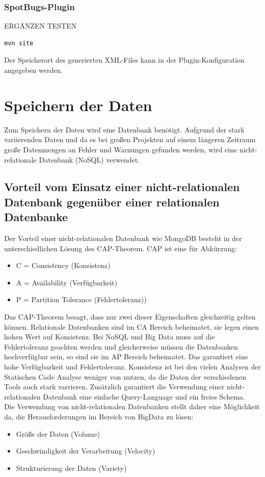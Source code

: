 \subsubsection{SpotBugs-Plugin}
ERGÄNZEN TESTEN
\begin{verbatim}
mvn site
\end{verbatim}
Der Speicherort des generierten XML-Files kann in der Plugin-Konfiguration angegeben werden.


\section{Speichern der Daten} 

Zum Speichern der Daten wird eine Datenbank benötigt. Aufgrund der stark variierenden Daten und da es bei großen Projekten auf einem längeren Zeitraum große Datenmengen an Fehler und Warnungen gefunden werden, wird eine nicht-relationale Datenbank (NoSQL) verwendet. 

\subsection{Vorteil vom Einsatz einer nicht-relationalen Datenbank gegenüber einer relationalen Datenbanke }
Der Vorteil einer nicht-relationalen Datenbank wie MongoDB besteht in der unterschiedlichen Lösung des CAP-Theorem. CAP ist eine für Abkürzung:

\begin{itemize}
\item C = Consistency (Konsistenz)
\item A = Availability (Verfügbarkeit) 
\item P = Partition Tolerance (Fehlertoleranz))
\end{itemize}

Das CAP-Theorem besagt, dass nur zwei dieser Eigenschaften gleichzeitig gelten können. 
Relationale Datenbanken sind im CA Bereich beheimatet, sie legen einen hohen Wert auf Konsistenz. Bei NoSQL und Big Data muss  auf die Fehlertoleranz geachten werden und gleicherweise müssen die Datenbanken hochverfügbar sein, so sind sie im AP Bereich beheimatet. Das garantiert eine hohe Verfügbarkeit und Fehlertoleranz. Konsistenz ist bei den vielen Analysen der Statischen Code Analyse weniger von nutzen, da die Daten der verschiedenen Tools auch stark varrieren. Zusätzlich garantiert die Verwendung einer nicht-relationalen Datenbank eine einfache Query-Language und ein freies Schema.\\
Die Verwendung von nicht-relationalen Datenbanken stellt daher eine Möglichkeit da, die Herausforderungen im Bereich von BigData zu lösen:
\begin{itemize}
\item Größe der Daten (Volume) 
\item Geschwindigkeit der Verarbeitung (Velocity)
\item Strukturierung der Daten (Variety)
\end{itemize}


